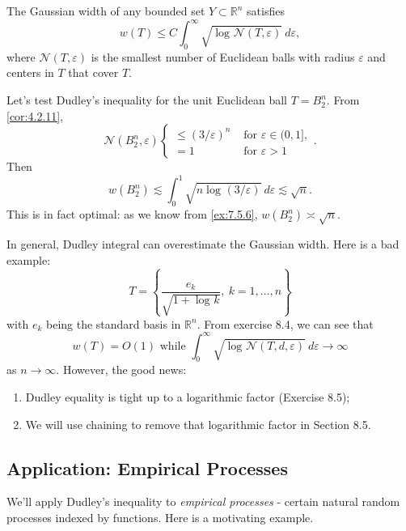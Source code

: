 \begin{theorem}
\label{thm:8.1.8}
The Gaussian width of any bounded set $Y \subset \mathbb{R}^n$ satisfies 
\[ w(T) \leq C \int_{0}^{\infty} \sqrt{\log_{}{\mathcal{N}(T, \varepsilon)}} \ d \varepsilon, \]
where $\mathcal{N}(T, \varepsilon)$ is the smallest number of Euclidean balls with radius $\varepsilon$ and 
centers in $T$ that cover $T$.
\end{theorem}

\begin{example}
\label{ex:8.1.9}
Let's test Dudley's inequality for the unit Euclidean ball $T = B_2^n$. From \cref{cor:4.2.11}, 
\[ \mathcal{N}(B_2^n, \varepsilon) \begin{cases}
	\leq (3 / \varepsilon)^n &\text{ for } \varepsilon \in (0, 1], \\
	= 1 &\text{ for } \varepsilon > 1
\end{cases}. \]
Then 
\[ w(B_2^n) \lesssim \int_{0}^{1} \sqrt{n \log_{}{(3 / \varepsilon)}} \ d \varepsilon \lesssim \sqrt{n}. \]
This is in fact optimal: as we know from \cref{ex:7.5.6}, $w(B_2^n) \asymp \sqrt{n}$.
\end{example}

\begin{remark}
\label{rmk:8.1.10}
In general, Dudley integral can overestimate the Gaussian width. Here is a bad example: 
\[ T = \left\{ \frac{e_k}{\sqrt{1 + \log_{}{k}}}, \ k = 1, \dots, n \right\} \]
with $e_k$ being the standard basis in $\mathbb{R}^n$. From exercise 8.4, we can see that 
\[ w(T) = O(1) \text{ while } \int_{0}^{\infty} \sqrt{\log_{}{\mathcal{N}(T, d, \varepsilon)}} \ d \varepsilon 
\to \infty \]
as $n \to \infty$. However, the good news:
\begin{enumerate}
	\item Dudley equality is tight up to a logarithmic factor (Exercise 8.5);
	\item We will use chaining to remove that logarithmic factor in Section 8.5.
\end{enumerate}
\end{remark}


\subsection{Application: Empirical Processes}
We'll apply Dudley's inequality to \textit{empirical processes} - certain natural random processes indexed by 
functions. Here is a motivating example.


